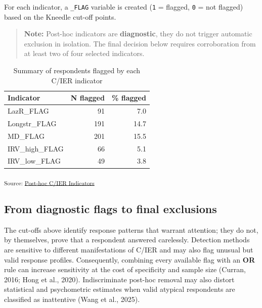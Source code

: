 \documentclass[
  letterpaper,
  DIV=11,
  numbers=noendperiod]{scrartcl}
\begin{document}
For each indicator, a \texttt{\_FLAG} variable is created (\texttt{1} =
flagged, \texttt{0} = not flagged) based on the Kneedle cut-off points.

\begin{quote}
\textbf{Note:} Post-hoc indicators are \textbf{diagnostic}, they do not
trigger automatic exclusion in isolation. The final decision below
requires corroboration from at least two of four selected indicators.
\end{quote}

{

\begin{longtable}[]{@{}lrr@{}}

\caption{\label{tbl-flags-overview}Summary of respondents flagged by
each C/IER indicator}

\tabularnewline

\toprule\noalign{}
Indicator & N flagged & \% flagged \\
\midrule\noalign{}
\endhead
\bottomrule\noalign{}
\endlastfoot
LazR\_FLAG & 91 & 7.0 \\
Longstr\_FLAG & 191 & 14.7 \\
MD\_FLAG & 201 & 15.5 \\
IRV\_high\_FLAG & 66 & 5.1 \\
IRV\_low\_FLAG & 49 & 3.8 \\

\end{longtable}

}

\textsubscript{Source:
\href{https://phdpablo.github.io/cier/Scripts/ProcessingScripts/02_posthoc-preview.html\#cell-tbl-flags-overview}{Post-hoc
C/IER Indicators}}

\subsection{From diagnostic flags to final
exclusions}\label{posthoc-decision}

The cut-offs above identify response patterns that warrant attention;
they do not, by themselves, prove that a respondent answered carelessly.
Detection methods are sensitive to different manifestations of C/IER and
may also flag unusual but valid response profiles. Consequently,
combining every available flag with an \textbf{OR} rule can increase
sensitivity at the cost of specificity and sample size (Curran, 2016;
Hong et al., 2020). Indiscriminate post-hoc removal may also distort
statistical and psychometric estimates when valid atypical respondents
are classified as inattentive (Wang et al., 2025).
\end{document}
